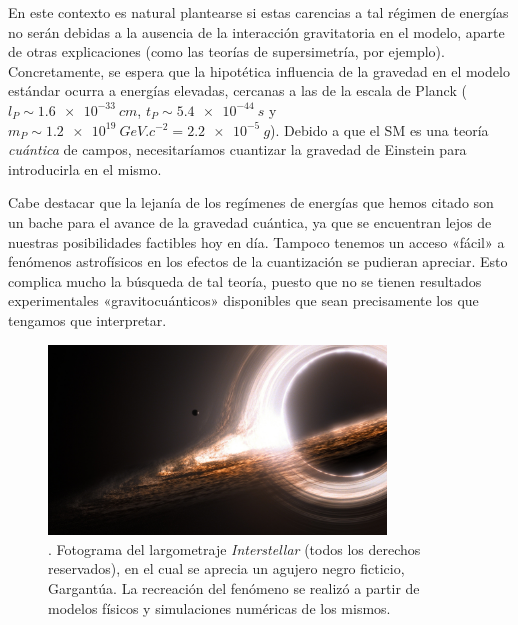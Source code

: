 \documentclass[11pt,a4paper,titlepage]{article}
\begin{document}
\begin{description}
{  En este contexto es natural plantearse si estas carencias a tal régimen de energías no serán debidas a la ausencia de la interacción gravitatoria en el modelo, aparte de otras explicaciones (como las teorías de supersimetría, por ejemplo). Concretamente, se espera que la hipotética influencia de la gravedad en el modelo estándar ocurra a energías elevadas, cercanas a las de la escala de Planck ($l_P\sim\SI{1.6e-33}{cm}$, $t_P\sim\SI{5.4e-44}{s}$ y $m_P\sim\SI{1.2e19}{GeV.c^{-2}}=\SI{2.2e-5}{g}$). Debido a que el SM es una teoría \textit{cuántica} de campos, necesitaríamos cuantizar la gravedad de Einstein para introducirla en el mismo.

  Cabe destacar que la lejanía de los regímenes de energías que hemos citado son un bache para el avance de la gravedad cuántica, ya que se encuentran lejos de nuestras posibilidades factibles hoy en día. Tampoco tenemos un acceso «fácil» a fenómenos astrofísicos en los efectos de la cuantización se pudieran apreciar. Esto complica mucho la búsqueda de tal teoría, puesto que no se tienen resultados experimentales «gravitocuánticos» disponibles que sean precisamente los que tengamos que interpretar.}
\end{description}

\begin{figure}[h]
	\centering
	\includegraphics[width=0.8\textwidth]{interstellar}
	\caption{\cite{interstellarbib}. Fotograma del largometraje \textit{Interstellar} (todos los derechos reservados), en el cual se aprecia un agujero negro ficticio, Gargantúa. La recreación del fenómeno se realizó a partir de modelos físicos y simulaciones numéricas de los mismos.}
	\label{interstellarbib}
\end{figure}
\end{document}

